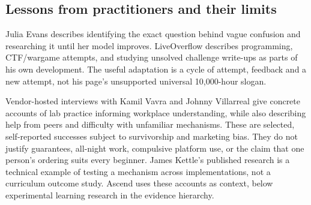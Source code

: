 \subsection{Lessons from practitioners and their limits}
Julia Evans describes identifying the exact question behind vague confusion and
researching it until her model improves. LiveOverflow describes programming,
CTF/wargame attempts, and studying unsolved challenge write-ups as parts of his
own development. The useful adaptation is a cycle of attempt, feedback and a new
attempt, not his page's unsupported universal 10,000-hour slogan.

Vendor-hosted interviews with Kamil Vavra and Johnny Villarreal give concrete
accounts of lab practice informing workplace understanding, while also describing
help from peers and difficulty with unfamiliar mechanisms. These are selected,
self-reported successes subject to survivorship and marketing bias. They do not
justify guarantees, all-night work, compulsive platform use, or the claim that one
person's ordering suits every beginner. James Kettle's published research is a
technical example of testing a mechanism across implementations, not a curriculum
outcome study. Ascend uses these accounts as context, below experimental learning
research in the evidence hierarchy.

